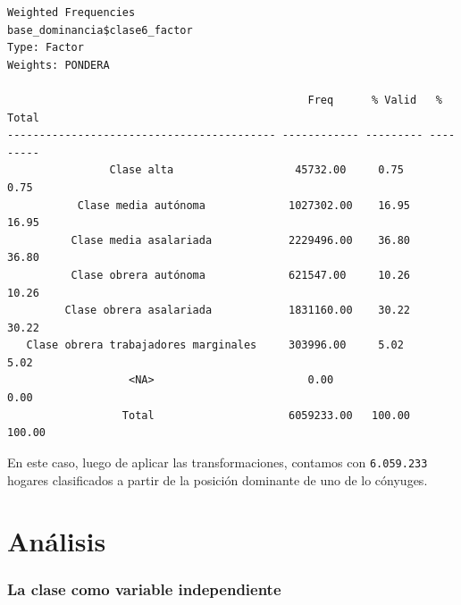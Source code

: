 \documentclass[
]{article}
\begin{document}
\begin{verbatim}
Weighted Frequencies  
base_dominancia$clase6_factor  
Type: Factor  
Weights: PONDERA  

                                               Freq      % Valid   % Total 
------------------------------------------ ------------ --------- ---------
                Clase alta                   45732.00     0.75      0.75   
           Clase media autónoma             1027302.00    16.95     16.95  
          Clase media asalariada            2229496.00    36.80     36.80  
          Clase obrera autónoma             621547.00     10.26     10.26  
         Clase obrera asalariada            1831160.00    30.22     30.22  
   Clase obrera trabajadores marginales     303996.00     5.02      5.02   
                   <NA>                        0.00                 0.00   
                  Total                     6059233.00   100.00    100.00  
\end{verbatim}

En este caso, luego de aplicar las transformaciones, contamos con \texttt{6.059.233} hogares clasificados a partir de la posición dominante de uno de lo cónyuges.

\hypertarget{part-anuxe1lisis}{%
\part{Análisis}\label{part-anuxe1lisis}}

\hypertarget{independiente}{%
\section{La clase como variable independiente}\label{independiente}}
\end{document}

